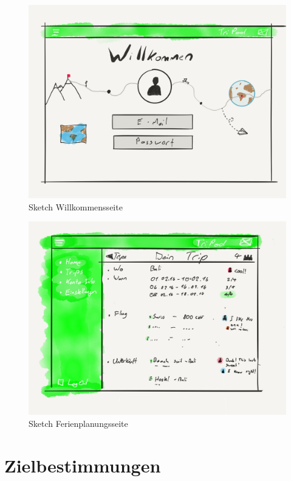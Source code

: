 \documentclass[10pt,a4paper,titlepage,twoside,german,final]{zhawreprt}
\numberwithin{table}{chapter}
\begin{document}
\begin{figure}[ht!]
  \includegraphics[width=\linewidth]{images/wire_Welcome.png}
  \caption{Sketch Willkommensseite}
  \label{fig:TripPodLogo3}
\end{figure}
\begin{figure}[ht!]
  \includegraphics[width=\linewidth]{images/wire_Trip.png}
  \caption{Sketch Ferienplanungsseite}
  \label{fig:TripPodLogo4}
\end{figure}


\chapter{Zielbestimmungen}\label{chp:DefinitionOfGoals}
\end{document}
